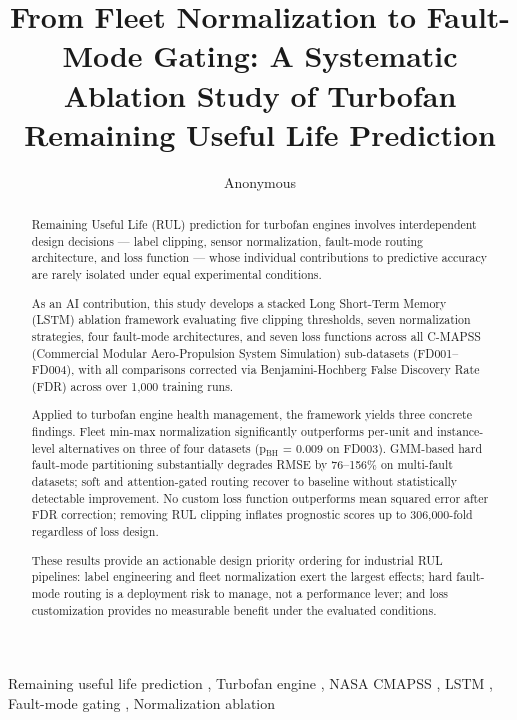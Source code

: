 \documentclass[preprint,10pt]{elsarticle}
\begin{document}
\begin{frontmatter}

\title{From Fleet Normalization to Fault-Mode Gating: A Systematic Ablation Study of Turbofan Remaining Useful Life Prediction}

\author{Anonymous}

\begin{abstract}
Remaining Useful Life (RUL) prediction for turbofan engines involves interdependent design decisions --- label clipping, sensor normalization, fault-mode routing architecture, and loss function --- whose individual contributions to predictive accuracy are rarely isolated under equal experimental conditions.

As an AI contribution, this study develops a stacked Long Short-Term Memory (LSTM) ablation framework evaluating five clipping thresholds, seven normalization strategies, four fault-mode architectures, and seven loss functions across all C-MAPSS (Commercial Modular Aero-Propulsion System Simulation) sub-datasets (FD001--FD004), with all comparisons corrected via Benjamini-Hochberg False Discovery Rate (FDR) across over 1,000 training runs.

Applied to turbofan engine health management, the framework yields three concrete findings. Fleet min-max normalization significantly outperforms per-unit and instance-level alternatives on three of four datasets (p$_\text{BH}$ = 0.009 on FD003). GMM-based hard fault-mode partitioning substantially degrades RMSE by 76--156\% on multi-fault datasets; soft and attention-gated routing recover to baseline without statistically detectable improvement. No custom loss function outperforms mean squared error after FDR correction; removing RUL clipping inflates prognostic scores up to 306,000-fold regardless of loss design.

These results provide an actionable design priority ordering for industrial RUL pipelines: label engineering and fleet normalization exert the largest effects; hard fault-mode routing is a deployment risk to manage, not a performance lever; and loss customization provides no measurable benefit under the evaluated conditions.
\end{abstract}

\begin{keyword}
Remaining useful life prediction \sep
Turbofan engine \sep
NASA CMAPSS \sep
LSTM \sep
Fault-mode gating \sep
Normalization ablation
\end{keyword}

\end{frontmatter}
\end{document}
